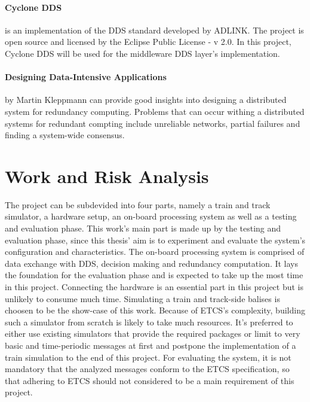 \documentclass[a4paper, 12pt]{scrartcl}
\begin{document}
\paragraph{Cyclone DDS} is an implementation of the \ac{DDS} standard developed by ADLINK.
The project is open source and licensed by the Eclipse Public License - v 2.0.
In this project, Cyclone DDS will be used for the middleware \ac{DDS} layer's implementation.
\vspace{-0.4cm}
\paragraph{Designing Data-Intensive Applications} by Martin Kleppmann can provide good insights into designing a distributed system for redundancy computing.
Problems that can occur withing a distributed systems for redundant compting include unreliable networks, partial failures and finding a system-wide consensus.

\section*{Work and Risk Analysis}
The project can be subdevided into four parts, namely a train and track simulator, a hardware setup, an on-board processing system as well as a testing and evaluation phase.
This work's main part is made up by the testing and evaluation phase, since this thesis' aim is to experiment and evaluate the system's configuration and characteristics.
The on-board processing system is comprised of data exchange with \ac{DDS}, decision making and redundancy computation.
It lays the foundation for the evaluation phase and is expected to take up the most time in this project.
Connecting the hardware is an essential part in this project but is unlikely to consume much time.
Simulating a train and track-side balises is choosen to be the show-case of this work.
Because of \ac{ETCS}'s complexity, building such a simulator from scratch is likely to take much resources.
It's preferred to either use existing simulators that provide the required packages or limit to very basic and time-periodic messages at first and postpone the implementation of a train simulation to the end of this project.
For evaluating the system, it is not mandatory that the analyzed messages conform to the \ac{ETCS} specification, so that adhering to \ac{ETCS} should not considered to be a main requirement of this project.
\end{document}
